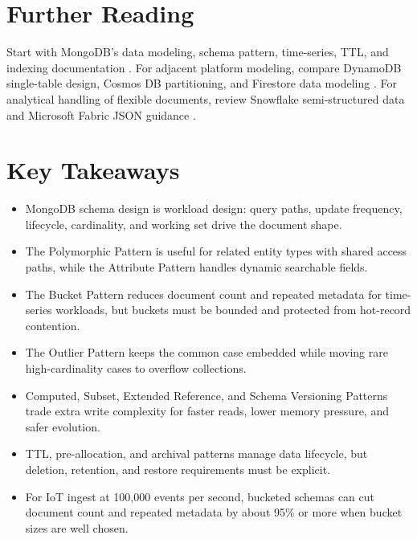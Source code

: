 \section{Further Reading}
Start with MongoDB's data modeling, schema pattern, time-series, TTL, and indexing documentation \cite{mongodbDataModelingDocs,mongodbSchemaPatternsDocs,mongodbTimeSeriesDocs,mongodbTTLDocs,mongodbIndexesDocs}. For adjacent platform modeling, compare DynamoDB single-table design, Cosmos DB partitioning, and Firestore data modeling \cite{dynamodbSingleTableDocs,cosmosPartitionDocs,firestoreDataModelDocs}. For analytical handling of flexible documents, review Snowflake semi-structured data and Microsoft Fabric JSON guidance \cite{snowflakeSemiStructuredDocs,fabricJsonDocs}.

\section*{Key Takeaways}
\begin{itemize}
    \item MongoDB schema design is workload design: query paths, update frequency, lifecycle, cardinality, and working set drive the document shape.
    \item The Polymorphic Pattern is useful for related entity types with shared access paths, while the Attribute Pattern handles dynamic searchable fields.
    \item The Bucket Pattern reduces document count and repeated metadata for time-series workloads, but buckets must be bounded and protected from hot-record contention.
    \item The Outlier Pattern keeps the common case embedded while moving rare high-cardinality cases to overflow collections.
    \item Computed, Subset, Extended Reference, and Schema Versioning Patterns trade extra write complexity for faster reads, lower memory pressure, and safer evolution.
    \item TTL, pre-allocation, and archival patterns manage data lifecycle, but deletion, retention, and restore requirements must be explicit.
    \item For IoT ingest at 100,000 events per second, bucketed schemas can cut document count and repeated metadata by about 95\% or more when bucket sizes are well chosen.
\end{itemize}

